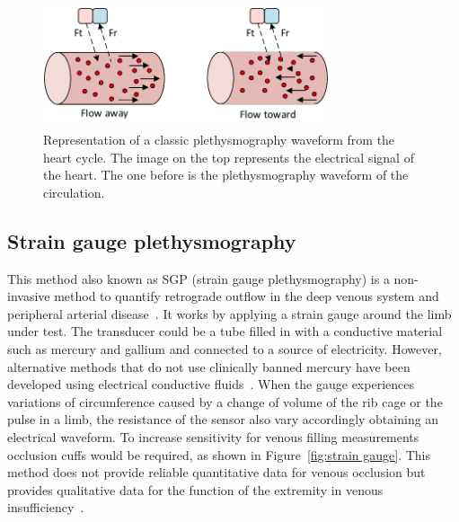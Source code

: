 
\begin{figure}[!htpb]
	\centering
	\includegraphics[width=0.75\textwidth,keepaspectratio]{figure3}    
	\caption[Doppler technique to measure flow]{Representation of a classic plethysmography waveform from the heart cycle. The image on the top represents the electrical signal of the heart. The one before is the plethysmography waveform of the circulation.}
	\label{fig:Doppler method}
\end{figure}


\subsection{Strain gauge plethysmography}
\label{section literature 3.3}
This method also known as SGP (strain gauge plethysmography) is a non-invasive method to quantify retrograde outflow in the deep venous system and peripheral arterial disease~\cite{holohan1996plethysmography}. It works by applying a strain gauge around the limb under test. The transducer could be a tube filled in with a conductive material such as mercury and gallium and connected to a source of electricity. However, alternative methods that do not use clinically banned mercury have been developed using electrical conductive fluids~\cite{flowers1981strain}. When the gauge experiences variations of circumference caused by a change of volume of the rib cage or the pulse in a limb, the resistance of the sensor also vary accordingly obtaining an electrical waveform. To increase sensitivity for venous filling measurements occlusion cuffs would be required, as shown in Figure~\ref{fig:strain gauge}. This method does not provide reliable quantitative data for venous occlusion but provides qualitative data for the function of the extremity in venous insufficiency~\cite{holohan1996plethysmography}. 

